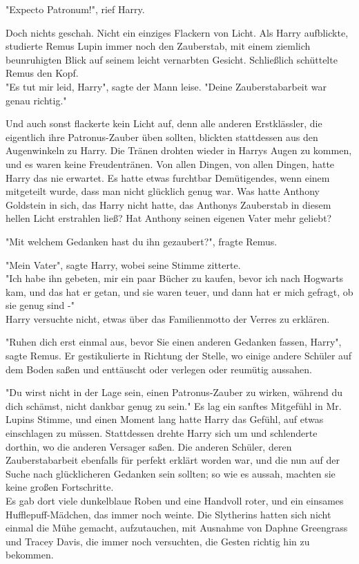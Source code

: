 {"Expecto Patronum!", rief Harry.

Doch nichts geschah. Nicht ein einziges Flackern von Licht. Als Harry aufblickte, studierte Remus Lupin immer noch den Zauberstab, mit einem ziemlich beunruhigten Blick auf seinem leicht vernarbten Gesicht. Schließlich schüttelte Remus den Kopf.\\ "Es tut mir leid, Harry", sagte der Mann leise. "Deine Zauberstabarbeit war genau richtig."

Und auch sonst flackerte kein Licht auf, denn alle anderen Erstklässler, die eigentlich ihre Patronus-Zauber üben sollten, blickten stattdessen aus den Augenwinkeln zu Harry. Die Tränen drohten wieder in Harrys Augen zu kommen, und es waren keine Freudentränen. Von allen Dingen, von allen Dingen, hatte Harry das nie erwartet. Es hatte etwas furchtbar Demütigendes, wenn einem mitgeteilt wurde, dass man nicht glücklich genug war. Was hatte Anthony Goldstein in sich, das Harry nicht hatte, das Anthonys Zauberstab in diesem hellen Licht erstrahlen ließ? Hat Anthony seinen eigenen Vater mehr geliebt?

"Mit welchem Gedanken hast du ihn gezaubert?", fragte Remus.

"Mein Vater", sagte Harry, wobei seine Stimme zitterte.\\ "Ich habe ihn gebeten, mir ein paar Bücher zu kaufen, bevor ich nach Hogwarts kam, und das hat er getan, und sie waren teuer, und dann hat er mich gefragt, ob sie genug sind -"\\ Harry versuchte nicht, etwas über das Familienmotto der Verres zu erklären.

"Ruhen dich erst einmal aus, bevor Sie einen anderen Gedanken fassen, Harry", sagte Remus. Er gestikulierte in Richtung der Stelle, wo einige andere Schüler auf dem Boden saßen und enttäuscht oder verlegen oder reumütig aussahen.

"Du wirst nicht in der Lage sein, einen Patronus-Zauber zu wirken, während du dich schämst, nicht dankbar genug zu sein." Es lag ein sanftes Mitgefühl in Mr. Lupins Stimme, und einen Moment lang hatte Harry das Gefühl, auf etwas einschlagen zu müssen. Stattdessen drehte Harry sich um und schlenderte dorthin, wo die anderen Versager saßen. Die anderen Schüler, deren Zauberstabarbeit ebenfalls für perfekt erklärt worden war, und die nun auf der Suche nach glücklicheren Gedanken sein sollten; so wie es aussah, machten sie keine großen Fortschritte.\\ Es gab dort viele dunkelblaue Roben und eine Handvoll roter, und ein einsames Hufflepuff-Mädchen, das immer noch weinte. Die Slytherins hatten sich nicht einmal die Mühe gemacht, aufzutauchen, mit Ausnahme von Daphne Greengrass und Tracey Davis, die immer noch versuchten, die Gesten richtig hin zu bekommen.

}
